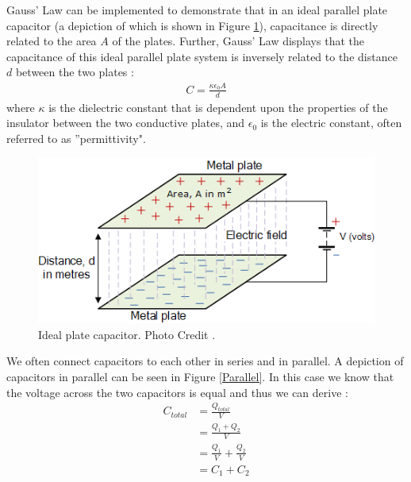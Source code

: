 \documentclass[oneside,12pt]{amsart}
\begin{document}
	\indent Gauss’ Law can be implemented to demonstrate that in an ideal parallel plate capacitor (a depiction of which is shown in Figure \ref{Ideal}), capacitance is directly related to the area $A$ of the plates. Further, Gauss’ Law displays that the capacitance of this ideal parallel plate system is inversely related to the distance $d$ between the two plates \cite{parallel}: 
	\begin{align*}
		C = \frac{\kappa \epsilon _{0}A}{d}
	\end{align*}
	where  $\kappa$ is the dielectric constant that is dependent upon the properties of the insulator between the two conductive plates, and $\epsilon_0$ is the electric constant, often referred to as ''permittivity".\\
	\begin{figure}[H]
		\includegraphics[width=\smallgraph,scale=0.01]{IdealCapacitor.png}
		\caption{Ideal plate capacitor. Photo Credit \cite{ideal}.}
		\label{Ideal}
	\end{figure}

	\indent We often connect capacitors to each other in series and in parallel. A depiction of capacitors in parallel can be seen in Figure \ref{Parallel}. In this case we know that the voltage across the two capacitors is equal\cite{cap} and thus we can derive :
	\begin{align*}
	C_{total} &= \frac{Q_{total}}{V} \\
	&=\frac{Q_1+Q_2}{V}\\
	&= \frac{Q_1}{V} + \frac{Q_2}{V}\\
	&= C_1 + C_2
	\end{align*}
	 
\end{document}
